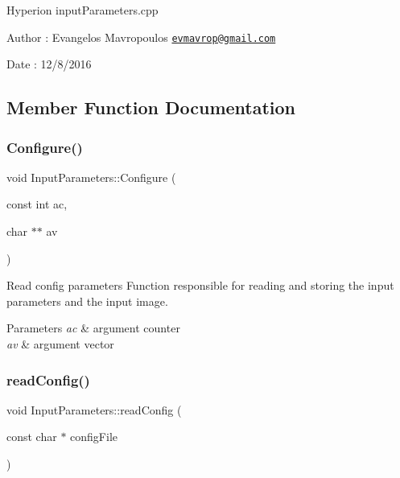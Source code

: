 Hyperion input\+Parameters.\+cpp

\begin{DoxyAuthor}{Author}
\+: Evangelos Mavropoulos \href{mailto:evmavrop@gmail.com}{\tt evmavrop@gmail.\+com} 
\end{DoxyAuthor}
\begin{DoxyDate}{Date}
\+: 12/8/2016 
\end{DoxyDate}


\subsection{Member Function Documentation}
\mbox{\label{classInputParameters_a94b0c8eb6a4312b6097c36f1bb7a4af5}} 
\subsubsection{\texorpdfstring{Configure()}{Configure()}}
{\footnotesize\ttfamily void Input\+Parameters\+::\+Configure (\begin{DoxyParamCaption}\item[{const int}]{ac,  }\item[{char $\ast$$\ast$}]{av }\end{DoxyParamCaption})}



Read config parameters Function responsible for reading and storing the input parameters and the input image. 


\begin{DoxyParams}{Parameters}
{\em ac} & argument counter \\
\hline
{\em av} & argument vector \\
\hline
\end{DoxyParams}
\mbox{\label{classInputParameters_ad6f1b367bcdc1dfc0264ae174d593a91}} 
\subsubsection{\texorpdfstring{read\+Config()}{readConfig()}}
{\footnotesize\ttfamily void Input\+Parameters\+::read\+Config (\begin{DoxyParamCaption}\item[{const char $\ast$}]{config\+File }\end{DoxyParamCaption})}




